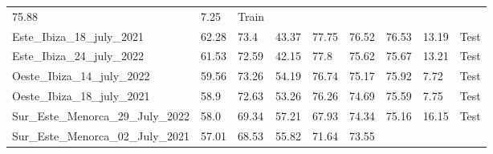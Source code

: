 \begin{table}[H]
{\begin{tabular}{lllllllll}
            75.88
                                                   & 7.25                &
            {\color[HTML]{66c2a5} Train}
            \\
            Este\_Ibiza\_18\_july\_2021            & 62.28               & 73.4
                                                   & 43.37               &
            77.75
                                                   & 76.52               &
            76.53
                                                   & 13.19               &
            {\color[HTML]{fc8d62} Test}
            \\
            Este\_Ibiza\_24\_july\_2022            & 61.53               &
            72.59
                                                   & 42.15               & 77.8
                                                   & 75.62               &
            75.67
                                                   & 13.21               &
            {\color[HTML]{fc8d62} Test}
            \\
            Oeste\_Ibiza\_14\_july\_2022           & 59.56               &
            73.26
                                                   & 54.19               &
            76.74
                                                   & 75.17               &
            75.92
                                                   & 7.72                &
            {\color[HTML]{fc8d62} Test}
            \\
            Oeste\_Ibiza\_18\_july\_2021           & 58.9                &
            72.63
                                                   & 53.26               &
            76.26
                                                   & 74.69               &
            75.59
                                                   & 7.75                &
            {\color[HTML]{fc8d62} Test}
            \\
            Sur\_Este\_Menorca\_29\_July\_2022     & 58.0                &
            69.34
                                                   & 57.21               &
            67.93
                                                   & 74.34               &
            75.16
                                                   & 16.15               &
            {\color[HTML]{fc8d62} Test}
            \\
            Sur\_Este\_Menorca\_02\_July\_2021     & 57.01               &
            68.53
                                                   & 55.82               &
            71.64
                                                   & 73.55               &

\end{tabular}}
\end{table}
